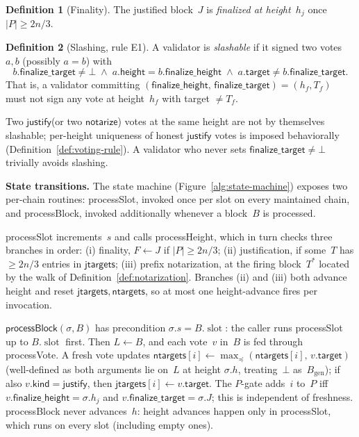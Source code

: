 \documentclass{article}
\newcommand{\genesis}{\ensuremath{B_{\mathrm{gen}}}}
\newcommand{\slot}[0]{\ensuremath{\operatorname{\mathrm{slot}}}}
\newcommand{\target}{\mathsf{target}}
\newcommand{\kind}{\mathsf{kind}}
\newcommand{\height}{\mathsf{height}}
\newcommand{\just}{\ensuremath{\mathsf{justify}}\xspace}
\newcommand{\notar}{\ensuremath{\mathsf{notarize}}\xspace}
\newcommand{\finalizeHeight}{\mathsf{finalize\_height}}
\newcommand{\finalizeTarget}{\mathsf{finalize\_target}}
\newcommand{\jtargets}{\mathsf{jtargets}}
\newcommand{\ntargets}{\mathsf{ntargets}}
\newcommand{\processSlot}{\textsf{processSlot}\xspace}
\newcommand{\processBlock}{\textsf{processBlock}\xspace}
\newcommand{\processHeight}{\textsf{processHeight}\xspace}
\newcommand{\processVote}{\textsf{processVote}\xspace}
\renewcommand{\paragraph}[1]{\vspace{7pt}\noindent\textbf{#1}}
\theoremstyle{plain}
\theoremstyle{definition}
\newtheorem{definition}{Definition}
\theoremstyle{remark}
\begin{document}
\begin{definition}[Finality]\label{def:finality}
The justified block~$J$ is \emph{finalized at height~$h_j$} once $|P| \geq 2n/3$.
\end{definition}

\begin{definition}[Slashing, rule E1]\label{def:slashing}
A validator is \emph{slashable} if it signed two votes~$a, b$ (possibly $a = b$) with
\[
  b.\finalizeTarget \neq \bot \;\wedge\; a.\height = b.\finalizeHeight \;\wedge\; a.\target \neq b.\finalizeTarget.
\]
That is, a validator committing $(\finalizeHeight,\, \finalizeTarget) = (h_f, T_f)$ must not sign any vote at height~$h_f$ with target $\neq T_f$.
\end{definition}

Two \just (or two \notar) votes at the same height are not by themselves slashable; per-height uniqueness of honest \just votes is imposed behaviorally (Definition~\ref{def:voting-rule}).
A validator who never sets $\finalizeTarget \neq \bot$ trivially avoids slashing.

\paragraph{State transitions.}
The state machine (Figure~\ref{alg:state-machine}) exposes two per-chain routines: \processSlot, invoked once per slot on every maintained chain, and \processBlock, invoked additionally whenever a block~$B$ is processed.

\processSlot increments~$s$ and calls \processHeight, which in turn checks three branches in order: (i) finality, $F \gets J$ if $|P| \geq 2n/3$; (ii) justification, if some~$T$ has $\geq 2n/3$ entries in $\jtargets$; (iii) prefix notarization, at the firing block~$T^*$ located by the walk of Definition~\ref{def:notarization}.
Branches (ii) and (iii) both advance height and reset $\jtargets, \ntargets$, so at most one height-advance fires per invocation.

$\processBlock(\sigma, B)$ has precondition $\sigma.s = B.\slot$: the caller runs \processSlot up to $B.\slot$ first.
Then $L \gets B$, and each vote~$v$ in~$B$ is fed through \processVote.
A fresh vote updates $\ntargets[i] \gets \max_{\preceq}(\ntargets[i],\, v.\target)$ (well-defined as both arguments lie on~$L$ at height $\sigma.h$, treating~$\bot$ as~$\genesis$); if also $v.\kind = \just$, then $\jtargets[i] \gets v.\target$.
The $P$-gate adds~$i$ to~$P$ iff $v.\finalizeHeight = \sigma.h_j$ and $v.\finalizeTarget = \sigma.J$; this is independent of freshness.
\processBlock never advances~$h$: height advances happen only in \processSlot, which runs on every slot (including empty ones).
\end{document}
